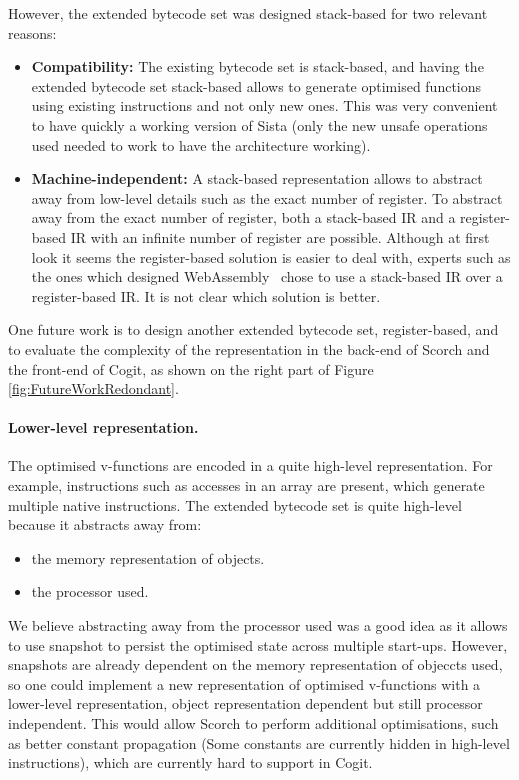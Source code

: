 \documentclass[a4paper,12pt,twoside]{../includes/ThesisStyle}
\begin{document}
However, the extended bytecode set was designed stack-based for two relevant reasons:
\begin{itemize}
	\item \textbf{Compatibility:} The existing bytecode set is stack-based, and having the extended bytecode set stack-based allows to generate optimised functions using existing instructions and not only new ones. This was very convenient to have quickly a working version of Sista (only the new unsafe operations used needed to work to have the architecture working).
	\item \textbf{Machine-independent:} A stack-based representation allows to abstract away from low-level details such as the exact number of register. To abstract away from the exact number of register, both a stack-based IR and a register-based IR with an infinite number of register are possible. Although at first look it seems the register-based solution is easier to deal with, experts such as the ones which designed WebAssembly~\cite{WebAssembly} chose to use a stack-based IR over a register-based IR. It is not clear which solution is better.
\end{itemize}	 

One future work is to design another extended bytecode set, register-based, and to evaluate the complexity of the representation in the back-end of Scorch and the front-end of Cogit, as shown on the right part of Figure \ref{fig:FutureWorkRedondant}.

\paragraph{Lower-level representation.}The optimised v-functions are encoded in a quite high-level representation. For example, instructions such as accesses in an array are present, which generate multiple native instructions. The extended bytecode set is quite high-level because it abstracts away from:
\begin{itemize}
	\item the memory representation of objects.
	\item the processor used.
\end{itemize}

We believe abstracting away from the processor used was a good idea as it allows to use snapshot to persist the optimised state across multiple start-ups. However, snapshots are already dependent on the memory representation of objeccts used, so one could implement a new representation of optimised v-functions with a lower-level representation, object representation dependent but still processor independent. This would allow Scorch to perform additional optimisations, such as better constant propagation (Some constants are currently hidden in high-level instructions), which are currently hard to support in Cogit.
\end{document}
